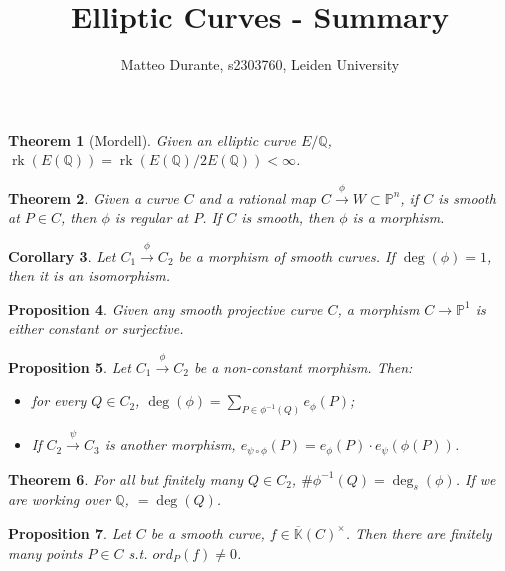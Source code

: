 \documentclass{article}
\newcommand{\numberset}{\mathbb}
\newcommand{\Q}{\numberset{Q}}
\newcommand{\K}{\numberset{K}}
\newcommand{\Ps}{\mathbb{P}}
\DeclareMathOperator{\rk}{rk}
\theoremstyle{plain}
\newtheorem{thm}{Theorem}
\newtheorem{prop}[thm]{Proposition}
\newtheorem{cor}[thm]{Corollary}
\theoremstyle{definition}
\begin{document}
\title{Elliptic Curves - Summary}

\author{Matteo Durante, s2303760, Leiden University}

\maketitle

\begin{thm}[Mordell]
    Given an elliptic curve $E/\Q$, $\rk(E(\Q))=\rk(E(\Q)/2E(\Q))<\infty$.
\end{thm}

\begin{thm}
    Given a curve $C$ and a rational map $C\xrightarrow{\phi}W\subset\Ps^n$, if
    $C$ is smooth at $P\in C$, then $\phi$ is regular at $P$. If $C$ is smooth,
    then $\phi$ is a morphism.
\end{thm}

\begin{cor}
    Let $C_1\xrightarrow{\phi}C_2$ be a morphism of smooth curves. If
    $\deg(\phi)=1$, then it is an isomorphism.
\end{cor}

\begin{prop}
    Given any smooth projective curve $C$, a morphism $C\rightarrow\Ps^1$ is
    either constant or surjective.
\end{prop}

\begin{prop}
    Let $C_1\xrightarrow{\phi}C_2$ be a non-constant morphism. Then:
    \begin{itemize}
        \item for every $Q\in C_2$, $\deg(\phi)=\sum_{P\in\phi^{-1}(Q)}e_\phi(P)$;
        \item If $C_2\xrightarrow{\psi}C_3$ is another morphism,
            $e_{\psi\circ\phi}(P)=e_\phi(P)\cdot e_{\psi}(\phi(P))$.
    \end{itemize}
\end{prop}

\begin{thm}
    For all but finitely many $Q\in C_2$, $\#\phi^{-1}(Q)=\deg_s(\phi)$. If we
    are working over $\Q$, $=\deg(Q)$.
\end{thm}

\begin{prop}
    Let $C$ be a smooth curve, $f\in\overline{\K}(C)^\times$. Then there are
    finitely many points $P\in C$ s.t. $ord_P(f)\neq 0$.
\end{prop}
\end{document}
